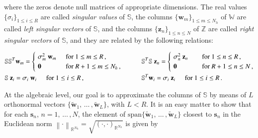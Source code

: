 \documentclass[longtitle]{elsarticle}
\numberwithin{equation}{section}
\theoremstyle{theorem}
\theoremstyle{definition}
\theoremstyle{remark}
\theoremstyle{proposition}
\numberwithin{figure}{section}
\newcommand{\norm}[1]{\left\lVert#1\right\rVert}
\newcommand{\wt}[1]{\widetilde{#1}}
\begin{document}
		where the zeros denote null matrices of appropriate dimensions. The real values $\big\lbrace \sigma_i \big\rbrace_{1 \leq i \leq R}$ are called \emph{singular values} of $\mathbb{S}$, the columns $\big\lbrace \mathbf{w}_m \big\rbrace_{1 \leq m \leq N_h}$ of $\mathbb{W}$ are called \emph{left singular vectors} of $\mathbb{S}$, and the columns $\big\lbrace \mathbf{z}_n \big\rbrace_{1 \leq n \leq N}$ of $\mathbb{Z}$ are called \emph{right singular vectors} of $\mathbb{S}$, and they are related by the following relations:
		\begin{linenomath}\begin{equation}
			\label{eq:svd-relationships}
			\begin{aligned}
				& \mathbb{S} \mathbb{S}^T \mathbf{w}_m = 
				\begin{cases}
					& \hspace*{-0.3cm} \sigma_m^2 ~ \mathbf{w}_m \hspace*{0.5cm} \text{for $1 \leq m \leq R$} \, , \\
					& \hspace*{-0.3cm} \mathrlap{\mathbf{0}}\hphantom{\sigma_m^2 ~ \mathbf{w}_m} \hspace*{0.5cm} \text{for $R+1 \leq m \leq {N_h}$} \, ,
				\end{cases}
				\qquad
				&& \mathbb{S}^T \mathbb{S} ~ \mathbf{z}_n =
				\begin{cases}
					& \hspace*{-0.3cm} \sigma_n^2 ~ \mathbf{z}_n \hspace*{0.74cm} \text{for $1 \leq n \leq R$} \, , \\
					& \hspace*{-0.3cm} \mathrlap{\mathbf{0}}\hphantom{\sigma_n^2 ~ \mathbf{z}_n} \hspace*{0.74cm} \text{for $R+1 \leq n \leq N$} \, ,
				\end{cases} \\
				& \mathbb{S} ~ \mathbf{z}_i = \sigma_i ~ \mathbf{w}_i \hspace*{0.5cm} \text{for $1 \leq i \leq R$} \, , 
				&& \mathbb{S}^T \mathbf{w}_i = \sigma_i ~ \mathbf{z}_i \hspace*{0.5cm} \text{for $1 \leq i \leq R$} \, .
			\end{aligned}
		\end{equation}\end{linenomath}
		At the algebraic level, our goal is to approximate the columns of $\mathbb{S}$ by means of $L$ orthonormal vectors $\big\lbrace \wt{\mathbf{w}}_1, \, \ldots \, , \wt{\mathbf{w}}_L \big\rbrace$, with $L < R$. It is an easy matter to show that for each $\mathbf{s}_n$, $n = 1, \, \ldots \, , N$, the element of $\text{span} \big\lbrace \wt{\mathbf{w}}_1, \, \ldots \, , \wt{\mathbf{w}}_L \big\rbrace$ closest to $\mathbf{s}_n$ in the Euclidean norm $\norm{\cdot}_{\mathbb{R}^{N_h}} = \sqrt{(\cdot,\cdot)_{\mathbb{R}^{N_h}}}$ is given by
\end{document}
